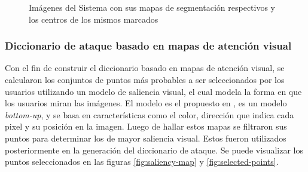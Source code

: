 \begin{figure}[H]
\begin{minipage}[hb]{0.3\textwidth}
	\end{minipage}
	\caption{Imágenes del Sistema con sus mapas de segmentaci\'on respectivos y los centros de los mismos marcados}
	\label{fig:images-segments}
\end{figure}

\subsubsection{Diccionario de ataque basado en mapas de atenci\'on visual}
Con el fin de construir el diccionario basado en mapas de atención visual, se calcularon los conjuntos de  puntos m\'as probables a ser seleccionados por los usuarios utilizando un modelo de saliencia visual, el cual modela la forma en que los usuarios miran las im\'agenes. El modelo es el propuesto en \cite{itti2000saliency}, es un modelo \textit{bottom-up}, y se basa en caracter\'isticas como el color, direcci\'on que indica cada pixel y su posici\'on en la imagen. Luego de hallar estos mapas se filtraron sus puntos para determinar los de mayor saliencia visual. Estos fueron utilizados posteriormente en la generaci\'on del diccionario de ataque. Se puede visualizar los puntos seleccionados en las figuras \ref{fig:saliency-map} y \ref{fig:selected-points}.

